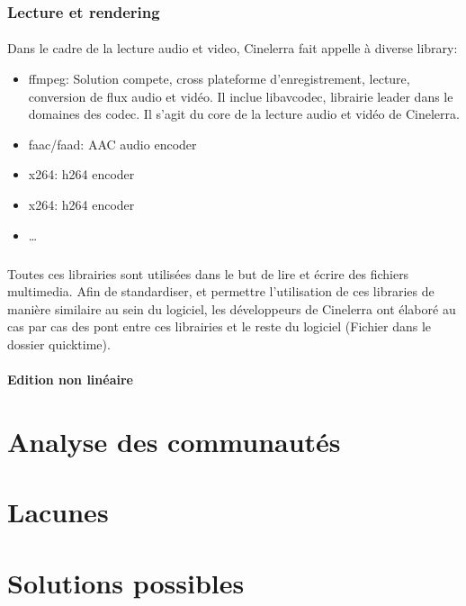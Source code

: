 \subsubsection{Lecture et rendering}

\paragraph{}

Dans le cadre de la lecture audio et video, Cinelerra fait appelle à diverse library:

\begin{itemize}

  \item{ffmpeg: Solution compete, cross plateforme d'enregistrement, lecture, conversion
    de flux audio et vidéo. Il inclue libavcodec, librairie leader dans le domaines des
    codec.
    Il s'agit du core de la lecture audio et vidéo de Cinelerra.}

  \item{faac/faad: AAC audio encoder}

  \item{x264: h264 encoder}

  \item{x264: h264 encoder}

  \item{\ldots}

\end{itemize}

\subparagraph{}

Toutes ces librairies sont utilisées dans le but de lire et écrire des fichiers multimedia.
Afin de standardiser, et permettre l'utilisation de ces libraries de manière similaire
au sein du logiciel, les développeurs de Cinelerra ont élaboré au cas par cas des pont entre
ces librairies et le reste du logiciel (Fichier dans le dossier quicktime).

\paragraph{Edition non linéaire}


\newpage \section{Analyse des communautés}

\newpage \section{Lacunes}

\newpage \section{Solutions possibles}
